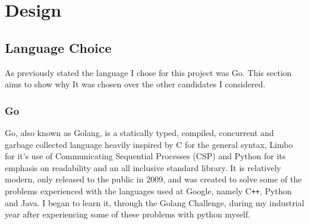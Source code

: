 \chapter{Design}




 


\section{Language Choice}
As previously stated the language I chose for this project was Go.
This section aims to show why It was chosen over the other candidates I considered.

\subsection{Go}
Go, also known as Golang, is a statically typed, compiled, concurrent and garbage collected language heavily inspired by C for the general syntax, Limbo for it's use of Communicating Sequential Processes (CSP)\cite{HOARE-CSP} and Python for its emphasis on readability and an all inclusive standard library.
It is relatively modern, only released to the public in 2009, and was created to solve some of the problems experienced with the languages used at Google, namely C\verb!++!, Python and Java.
I began to learn it, through the Golang Challenge\cite{GOLANG-CHALLENGE},  during my industrial year after experiencing some of these problems with python myself.

